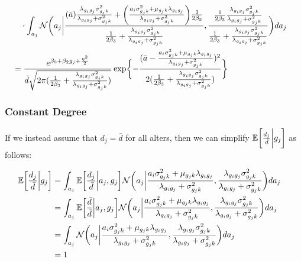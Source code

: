 \documentclass[12pt]{article}
\begin{document}
\begin{align}
&\hspace{10 pt}\cdot \int_{a_j} \mathcal{N} \biggl(a_j \biggl| 
\frac{ ( \bar{a} )\frac{\lambda_{g_ig_j} \sigma_{g_jk}^2}{\lambda_{g_ig_j} + \sigma_{g_jk}^2} 
+ \biggl( \frac{a_i \sigma_{g_jk}^2 + \mu_{g_jk} \lambda_{g_ig_j}}{\lambda_{g_ig_j} + \sigma_{g_jk}^2} \biggr) \frac{1}{2\beta_3} }
{ \frac{1}{2\beta_3} + \frac{\lambda_{g_ig_j} \sigma_{g_jk}^2}{\lambda_{g_ig_j} + \sigma_{g_jk}^2} }, 
\frac{ \frac{1}{2\beta_3}\frac{\lambda_{g_ig_j} \sigma_{g_jk}^2}{\lambda_{g_ig_j} + \sigma_{g_jk}^2} }{ \frac{1}{2\beta_3} + \frac{\lambda_{g_ig_j} \sigma_{g_jk}^2}{\lambda_{g_ig_j} + \sigma_{g_jk}^2} } \biggr) da_j
&& \\\nonumber
&= \frac{ e^{ \beta_0 + \beta_2 g_j + \frac{\eta^2}{2} } }{ \bar{d} \sqrt{ 2 \pi ( \frac{1}{2\beta_3} + \frac{\lambda_{g_ig_j} \sigma_{g_jk}^2}{\lambda_{g_ig_j} + \sigma_{g_jk}^2} ) }  }
\exp\biggl\{ -\frac{ ( \bar{a} - \frac{a_i \sigma_{g_jk}^2 + \mu_{g_jk} \lambda_{g_ig_j}}{\lambda_{g_ig_j} + \sigma_{g_jk}^2} )^2 }{ 2 ( \frac{1}{2\beta_3} + \frac{\lambda_{g_ig_j} \sigma_{g_jk}^2}{\lambda_{g_ig_j} + \sigma_{g_jk}^2} ) } \biggr\}
\end{align}

\subsubsection{Constant Degree}
\noindent  If we instead assume that $d_j = \bar{d}$ for all alters, then we can simplify $\mathbb{E}\biggl[ \frac{d_j}{\bar{d}} \biggl| g_j \biggr]$ as follows:

\begin{align}
\mathbb{E}\biggl[ \frac{d_j}{\bar{d}} \biggl| g_j \biggr] 
&= \int_{a_j} \mathbb{E}\biggl[ \frac{d_j}{\bar{d}} \biggl| a_j, g_j \biggr] 
\mathcal{N} \biggl(a_j \biggl| \frac{a_i \sigma_{g_jk}^2 + \mu_{g_jk} \lambda_{g_ig_j}}{\lambda_{g_ig_j} + \sigma_{g_jk}^2}, \frac{\lambda_{g_ig_j} \sigma_{g_jk}^2}{\lambda_{g_ig_j} + \sigma_{g_jk}^2} \biggr) da_j 
&& \\\nonumber
&= \int_{a_j} \mathbb{E}\biggl[ \frac{\bar{d}}{\bar{d}} \biggl| a_j, g_j \biggr] 
\mathcal{N} \biggl(a_j \biggl| \frac{a_i \sigma_{g_jk}^2 + \mu_{g_jk} \lambda_{g_ig_j}}{\lambda_{g_ig_j} + \sigma_{g_jk}^2}, \frac{\lambda_{g_ig_j} \sigma_{g_jk}^2}{\lambda_{g_ig_j} + \sigma_{g_jk}^2} \biggr) da_j 
&& \\\nonumber
&= \int_{a_j}  
\mathcal{N} \biggl(a_j \biggl| \frac{a_i \sigma_{g_jk}^2 + \mu_{g_jk} \lambda_{g_ig_j}}{\lambda_{g_ig_j} + \sigma_{g_jk}^2}, \frac{\lambda_{g_ig_j} \sigma_{g_jk}^2}{\lambda_{g_ig_j} + \sigma_{g_jk}^2} \biggr) da_j 
&& \\\nonumber
&= 1
\end{align}
\end{document}
